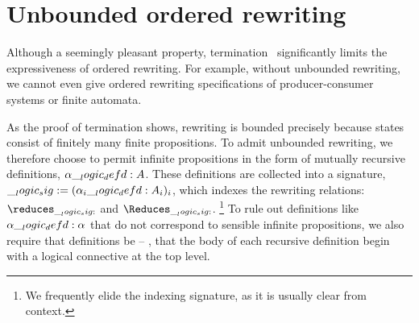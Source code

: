 





\section{Unbounded ordered rewriting}

\autocite{Aranda+:FMCO06}

Although a seemingly pleasant property, termination~ significantly limits the expressiveness of ordered rewriting.
For example, without unbounded rewriting, we cannot even give ordered rewriting specifications of producer-consumer systems or finite automata.

As the proof of termination shows, rewriting is bounded
precisely because
states
consist of finitely many finite propositions.
To admit unbounded rewriting, we therefore choose to permit infinite propositions in the form of mutually recursive definitions, $\alpha \__logic_defd: A$.
These definitions are collected into a signature, $\__logic_sig: = (\alpha_i \__logic_defd: A_i)_i$, which indexes the rewriting relations: $\reduces_{\sig}$ and $\Reduces_{\sig}$.%
\footnote{We frequently elide the indexing signature, as it is usually clear from context.} 
To rule out definitions like $\alpha \__logic_defd: \alpha$ that do not correspond to sensible infinite propositions, we also require that definitions be \autocite{Gay+Hole:AI05} -- \ie, that the body of each recursive definition begin with a logical connective at the top level.

